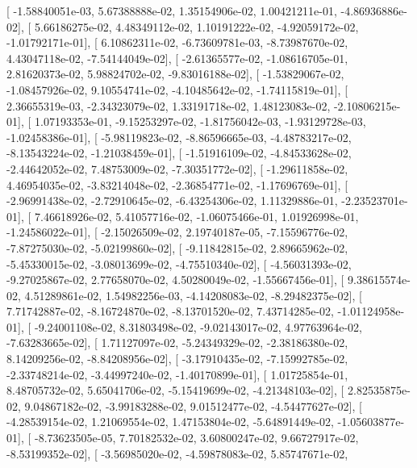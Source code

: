 \documentclass{article}
\begin{document}
       [ -1.58840051e-03,   5.67388888e-02,   1.35154906e-02,
          1.00421211e-01,  -4.86936886e-02],
       [  5.66186275e-02,   4.48349112e-02,   1.10191222e-02,
         -4.92059172e-02,  -1.01792171e-01],
       [  6.10862311e-02,  -6.73609781e-03,  -8.73987670e-02,
          4.43047118e-02,  -7.54144049e-02],
       [ -2.61365577e-02,  -1.08616705e-01,   2.81620373e-02,
          5.98824702e-02,  -9.83016188e-02],
       [ -1.53829067e-02,  -1.08457926e-02,   9.10554741e-02,
         -4.10485642e-02,  -1.74115819e-01],
       [  2.36655319e-03,  -2.34323079e-02,   1.33191718e-02,
          1.48123083e-02,  -2.10806215e-01],
       [  1.07193353e-01,  -9.15253297e-02,  -1.81756042e-03,
         -1.93129728e-03,  -1.02458386e-01],
       [ -5.98119823e-02,  -8.86596665e-03,  -4.48783217e-02,
         -8.13543224e-02,  -1.21038459e-01],
       [ -1.51916109e-02,  -4.84533628e-02,  -2.44642052e-02,
          7.48753009e-02,  -7.30351772e-02],
       [ -1.29611858e-02,   4.46954035e-02,  -3.83214048e-02,
         -2.36854771e-02,  -1.17696769e-01],
       [ -2.96991438e-02,  -2.72910645e-02,  -6.43254306e-02,
          1.11329886e-01,  -2.23523701e-01],
       [  7.46618926e-02,   5.41057716e-02,  -1.06075466e-01,
          1.01926998e-01,  -1.24586022e-01],
       [ -2.15026509e-02,   2.19740187e-05,  -7.15596776e-02,
         -7.87275030e-02,  -5.02199860e-02],
       [ -9.11842815e-02,   2.89665962e-02,  -5.45330015e-02,
         -3.08013699e-02,  -4.75510340e-02],
       [ -4.56031393e-02,  -9.27025867e-02,   2.77658070e-02,
          4.50280049e-02,  -1.55667456e-01],
       [  9.38615574e-02,   4.51289861e-02,   1.54982256e-03,
         -4.14208083e-02,  -8.29482375e-02],
       [  7.71742887e-02,  -8.16724870e-02,  -8.13701520e-02,
          7.43714285e-02,  -1.01124958e-01],
       [ -9.24001108e-02,   8.31803498e-02,  -9.02143017e-02,
          4.97763964e-02,  -7.63283665e-02],
       [  1.71127097e-02,  -5.24349329e-02,  -2.38186380e-02,
          8.14209256e-02,  -8.84208956e-02],
       [ -3.17910435e-02,  -7.15992785e-02,  -2.33748214e-02,
         -3.44997240e-02,  -1.40170899e-01],
       [  1.01725854e-01,   8.48705732e-02,   5.65041706e-02,
         -5.15419699e-02,  -4.21348103e-02],
       [  2.82535875e-02,   9.04867182e-02,  -3.99183288e-02,
          9.01512477e-02,  -4.54477627e-02],
       [ -4.28539154e-02,   1.21069554e-02,   1.47153804e-02,
         -5.64891449e-02,  -1.05603877e-01],
       [ -8.73623505e-05,   7.70182532e-02,   3.60800247e-02,
          9.66727917e-02,  -8.53199352e-02],
       [ -3.56985020e-02,  -4.59878083e-02,   5.85747671e-02,
\end{document}
